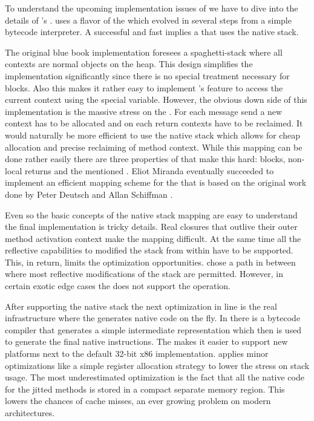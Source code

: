 To understand the upcoming implementation issues of \NBJ we have to dive into the details of \PH's \JIT.
\PH uses a flavor of the \Cog \VM which evolved in several steps from a simple bytecode interpreter.
A successful and fast \JIT implies a \VM that uses the native stack.

The original  blue book implementation foresees a spa\-ghet\-ti-stack where all contexts are normal objects on the heap.
This design simplifies the \VM implementation significantly since there is no special treatment necessary for blocks.
Also this makes it rather easy to implement \PH's feature to access the current context using the special  variable.
However, the obvious down side of this implementation is the massive stress on the \GC.
For each message send a new context has to be allocated and on each return contexts have to be reclaimed.
It would naturally be more efficient to use the native stack which allows for cheap allocation and precise reclaiming of method context.
While this mapping can be done rather easily there are three properties of \PH that make this hard: blocks, non-local returns and the mentioned .
Eliot Miranda eventually succeeded to implement an efficient mapping scheme for the \Cog \VM that is based on the original work done by Peter Deutsch and Allan Schiffman \cite{Deut84a}.

Even so the basic concepts of the native stack mapping are easy to understand the final implementation is tricky details.
Real closures that outlive their outer method activation context make the mapping difficult.
At the same time all the reflective capabilities to modified the stack from within \PH have to be supported.
This, in return, limits the optimization opportunities.
\Cog chose a path in between where most reflective modifications of the stack are permitted.
However, in certain exotic edge cases the \VM does not support the operation.

After supporting the native stack the next optimization in line is the real \JIT infrastructure where the \VM generates native code on the fly.
In \Cog there is a bytecode compiler that generates a simple intermediate representation which then is used to generate the final native instructions.
The \IR makes it easier to support new platforms next to the default 32-bit x86 implementation.
\Cog applies minor optimizations like a simple register allocation strategy to lower the stress on stack usage.
The most underestimated optimization is the fact that all the native code for the jitted methods is stored in a compact separate memory region.
This lowers the chances of cache misses, an ever growing problem on modern \CPU architectures.

